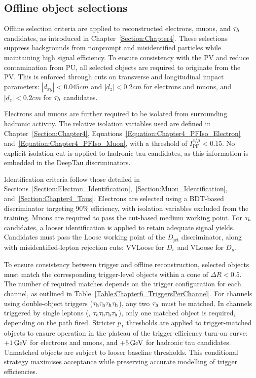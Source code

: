 \subsection{Offline object selections}
\label{Section:Chapter6_ObjectSelection}

Offline selection criteria are applied to reconstructed electrons, muons, and $\tau_h$candidates, as introduced in Chapter~\ref{Section:Chapter4}. These selections suppress backgrounds from nonprompt and misidentified particles while maintaining high signal efficiency. To ensure consistency with the PV and reduce contamination from PU, all selected objects are required to originate from the PV. This is enforced through cuts on transverse and longitudinal impact parameters: $|d_{xy}| < 0.045\unit{cm}$ and $|d_z| < 0.2\unit{cm}$ for electrons and muons, and $|d_z| < 0.2\unit{cm}$ for $\tau_h$ candidates.

Electrons and muons are further required to be isolated from surrounding hadronic activity. The relative isolation variables used are defined in Chapter~\ref{Section:Chapter4}, Equations~\ref{Equation:Chapter4_PFIso_Electron} and~\ref{Equation:Chapter4_PFIso_Muon}, with a threshold of $I^{e/\mu}_\text{PF} < 0.15$. No explicit isolation cut is applied to hadronic tau candidates, as this information is embedded in the DeepTau discriminators.

Identification criteria follow those detailed in Sections~\ref{Section:Electron_Identification},~\ref{Section:Muon_Identification}, and~\ref{Section:Chapter4_Taus}. Electrons are selected using a BDT-based discriminator targeting 90\% efficiency, with isolation variables excluded from the training. Muons are required to pass the cut-based medium working point. For $\tau_h$ candidates, a looser identification is applied to retain adequate signal yields. Candidates must pass the Loose working point of the $D_{\text{jet}}$ discriminator, along with misidentified-lepton rejection cuts: VVLoose for $D_e$ and VLoose for $D_\mu$. 

To ensure consistency between trigger and offline reconstruction, selected objects must match the corresponding trigger-level objects within a cone of $\Delta R < 0.5$. The number of required matches depends on the trigger configuration for each channel, as outlined in Table~\ref{Table:Chapter6_TriggersPerChannel}. For channels using double-object triggers (\eg $\tau_\mathrm{h}\tau_\mathrm{h}\tau_\mathrm{h}\tau_\mathrm{h}$), any two $\tau_\mathrm{h}$ must be matched. In channels triggered by single leptons (\eg, $\tau_e\tau_\mathrm{h}\tau_\mathrm{h}\tau_\mathrm{h}$), only one matched object is required, depending on the path fired. Stricter $p_T$ thresholds are applied to trigger-matched objects to ensure operation in the plateau of the trigger efficiency turn-on curve: $+1\,\text{Ge\hspace{-.08em}V}$ for electrons and muons, and $+5\,\text{Ge\hspace{-.08em}V}$ for hadronic tau candidates. Unmatched objects are subject to looser baseline thresholds. This conditional strategy maximises acceptance while preserving accurate modelling of trigger efficiencies.

